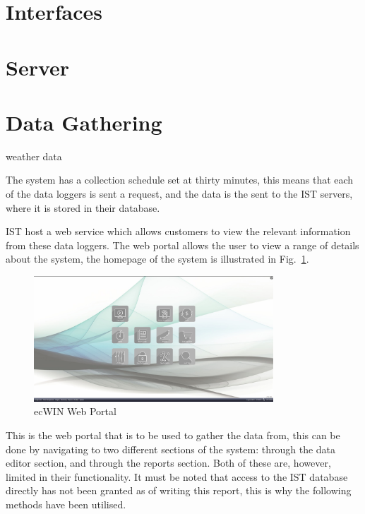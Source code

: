 \documentclass[12pt,onecolumn]{IEEEtran}
\begin{document}
\section{Interfaces} \label{sec:Interfaces}

\section{Server} \label{Server}
\section{Data Gathering} \label{sec:DataGathering}
weather data

The system has a collection schedule set at thirty minutes, this means that each of the data loggers is sent a request, and the data is the sent to the IST servers, where it is stored in their database. 


IST host a web service which allows customers to view the relevant information from these data loggers. 
The web portal allows the user to view a range of details about the system, the homepage of the system is illustrated in Fig.~\ref{fig:ecwin}.

\begin{center}
    \begin{figure}[htb]
        \centering
        \includegraphics[width=0.8\textwidth]{ecwin.png}
        \caption{ecWIN Web Portal}
        \label{fig:ecwin}
    \end{figure}
\end{center}

This is the web portal that is to be used to gather the data from, this can be done by navigating to two different sections of the system: through the data editor section, and through the reports section. Both of these are, however, limited in their functionality. It must be noted that access to the IST database directly has not been granted as of writing this report, this is why the following methods have been utilised.
\end{document}
